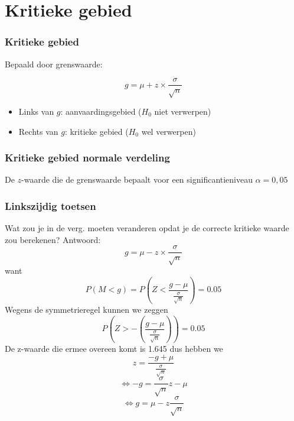 \documentclass{beamer}
\begin{document}
\section{Kritieke gebied}

\sectionframelogo{}

\begin{frame}
  \frametitle{Kritieke gebied}
  
  
  Bepaald door grenswaarde:
  
  \[g = \mu + z \times \frac{\sigma}{\sqrt{n}} \]
  
  \begin{itemize}
    \item Links van $g$: aanvaardingsgebied ($H_0$ niet verwerpen)
    \item Rechts van $g$: kritieke gebied ($H_0$ wel verwerpen)
  \end{itemize}
  
\end{frame}


\begin{frame}
  \frametitle{Kritieke gebied normale verdeling}

  \centering
  
  De $z$-waarde die de grenswaarde bepaalt voor een significantieniveau $\alpha = 0,05$
\end{frame}

\begin{frame}
  \frametitle{Linkszijdig toetsen}
    Wat zou je in de verg.  moeten veranderen opdat je de correcte kritieke waarde zou berekenen?
    \pause
    Antwoord:
 \[g = \mu - z \times \frac{\sigma}{\sqrt{n}} \]
want
\[ P(M < g) = P\left(Z < \frac{g - \mu}{\frac{\sigma}{\sqrt{n}}}\right) = 0.05 \]
Wegens de symmetrieregel kunnen we zeggen
\[ P\left(Z > - \left( \frac{g - \mu}{\frac{\sigma}{\sqrt{n}}} \right) \right) = 0.05 \]
De z-waarde die ermee overeen komt is 1.645 dus hebben we
\[ z = \frac{-g + \mu}{\frac{\sigma}{\sqrt{n}}} \]
\[ \Leftrightarrow -g = \frac{\sigma}{\sqrt{n}} z - \mu \]
\[ \Leftrightarrow g = \mu - z \frac{\sigma}{\sqrt{n}} \]
\end{frame}
\end{document}
